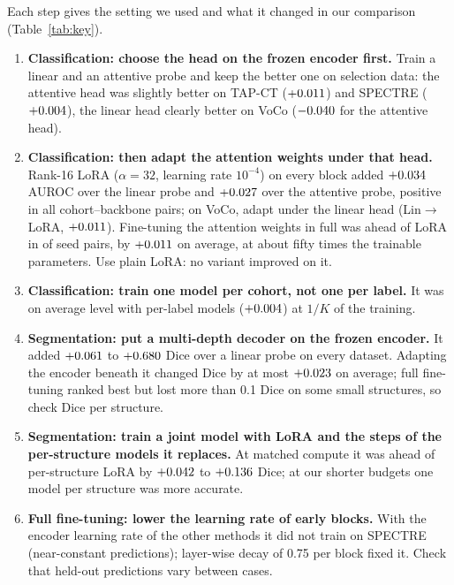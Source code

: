 Each step gives the setting we used and what it changed in our comparison (Table~\ref{tab:key}).
\begin{enumerate}\setlength{\itemsep}{1pt}
  \item \textbf{Classification: choose the head on the frozen encoder first.} Train a linear and an attentive probe and keep the better one on selection data: the attentive head was slightly better on TAP-CT ($+0.011$) and SPECTRE ($+0.004$), the linear head clearly better on VoCo ($-0.040$ for the attentive head).
  \item \textbf{Classification: then adapt the attention weights under that head.} Rank-16 LoRA ($\alpha=32$, learning rate $10^{-4}$) on every block added $+0.034$ AUROC over the linear probe and $+0.027$ over the attentive probe, positive in all \numCiClsloraattnAllClustersN{} cohort--backbone pairs; on VoCo, adapt under the linear head (Lin$\to$LoRA, $+0.011$). Fine-tuning the attention weights in full was ahead of LoRA in \numSeedsclsAttnftLoraAllPosN{} of \numSeedsclsAttnftLoraAllPairsN{} seed pairs, by $+0.011$ on average, at about fifty times the trainable parameters. Use plain LoRA: no variant improved on it.
  \item \textbf{Classification: train one model per cohort, not one per label.} It was on average level with per-label models ($+0.004$) at $1/K$ of the training.
  \item \textbf{Segmentation: put a multi-depth decoder on the frozen encoder.} It added $+0.061$ to $+0.680$ Dice over a linear probe on every dataset. Adapting the encoder beneath it changed Dice by at most $+0.023$ on average; full fine-tuning ranked best but lost more than 0.1 Dice on some small structures, so check Dice per structure.
  \item \textbf{Segmentation: train a joint model with LoRA and the steps of the per-structure models it replaces.} At matched compute it was ahead of per-structure LoRA by $+0.042$ to $+0.136$ Dice; at our shorter budgets one model per structure was more accurate.
  \item \textbf{Full fine-tuning: lower the learning rate of early blocks.} With the encoder learning rate of the other methods it did not train on SPECTRE (near-constant predictions); layer-wise decay of 0.75 per block fixed it. Check that held-out predictions vary between cases.
\end{enumerate}

